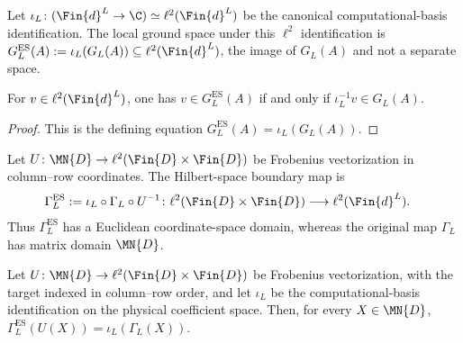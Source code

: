 \begin{definition}\label{def:ground_space_es}
    \leanok
    Let $\iota_L\colon(\Fin{d}^{L}\to\C)\simeq\ell^2(\Fin{d}^{L})$ be the
    canonical computational-basis identification. The local ground space under
    this $\ell^2$ identification is
    $G_L^{\mathrm{ES}}(A):=\iota_L(G_L(A))
        \subseteq\ell^2(\Fin{d}^{L})$, the image of $G_L(A)$ and not a
    separate space.
\end{definition}

\begin{lemma}\label{lem:mem_ground_space_es}
    \leanok
    For $v\in\ell^2(\Fin{d}^{L})$, one has $v\in G_L^{\mathrm{ES}}(A)$ if and
    only if $\iota_L^{-1}v\in G_L(A)$.
\end{lemma}

\begin{proof}
    \leanok
    This is the defining equation
    $G_L^{\mathrm{ES}}(A)=\iota_L(G_L(A))$.
\end{proof}

\begin{definition}
    \label{def:ground_space_map_es}
    \leanok
    Let $U\colon\MN{D}\to\ell^2(\Fin{D}\times\Fin{D})$ be Frobenius
    vectorization in column--row coordinates.  The Hilbert-space boundary map
    is
    \begin{align}
        \Gamma_L^{\mathrm{ES}}
         & :=\iota_L\circ\Gamma_L\circ U^{-1}
        \colon\ell^2(\Fin{D}\times\Fin{D})
        \longrightarrow\ell^2(\Fin{d}^{L}).
    \end{align}
    Thus $\Gamma_L^{\mathrm{ES}}$ has a Euclidean coordinate-space domain,
    whereas the original map $\Gamma_L$ has matrix domain $\MN{D}$.
\end{definition}

\begin{lemma}
    \label{thm:ground_space_map_es_frobenius}
    \leanok
    Let $U\colon\MN{D}\to\ell^2(\Fin{D}\times\Fin{D})$ be Frobenius
    vectorization, with the target indexed in column--row order, and let
    $\iota_L$ be the computational-basis identification on the physical
    coefficient space.  Then, for every $X\in\MN{D}$,
    $\Gamma_L^{\mathrm{ES}}(U(X))=\iota_L(\Gamma_L(X))$.
\end{lemma}


